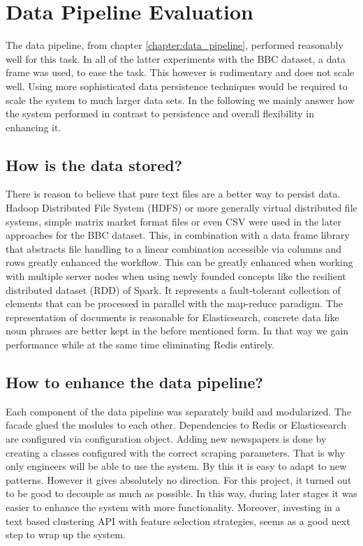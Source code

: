 \section{Data Pipeline Evaluation}
The data pipeline, from chapter \ref{chapter:data_pipeline}, performed reasonably well for this task. In all of the latter experiments with the BBC dataset, a data frame was used, to ease the task. This however is rudimentary and does not scale well. Using more sophisticated data persistence techniques would be required to scale the system to much larger data sets. In the following we mainly answer how the system performed in contrast to persistence and overall flexibility in enhancing it.

\subsection*{How is the data stored?} 
There is reason to believe that pure text files are a better way to persist data. Hadoop Distributed File System (HDFS) or more generally virtual distributed file systems, simple matrix market format files or even CSV were used in the later approaches for the BBC dataset. This, in combination with a data frame library that abstracts file handling to a linear combination accessible via columns and rows greatly enhanced the workflow. This can be greatly enhanced when working with multiple server nodes when using newly founded concepts like the resilient distributed dataset (RDD) of Spark. It represents a fault-tolerant collection of elements that can be processed in parallel with the map-reduce paradigm. The representation of documents is reasonable for Elasticsearch, concrete data like noun phrases are better kept in the before mentioned form. In that way we gain performance while at the same time eliminating Redis entirely.

\subsection*{How to enhance the data pipeline?} 
Each component of the data pipeline was separately build and modularized. The facade glued the modules to each other. Dependencies to Redis or Elasticsearch are configured via configuration object. Adding new newspapers is done by creating a classes configured with the correct scraping parameters. That is why only engineers will be able to use the system. By this it is easy to adapt to new patterns. However it gives absolutely no direction. For this project, it turned out to be good to decouple as much as possible. In this way, during later stages it was easier to enhance the system with more functionality. Moreover, investing in a text based clustering API with feature selection strategies, seems as a good next step to wrap up the system. 


